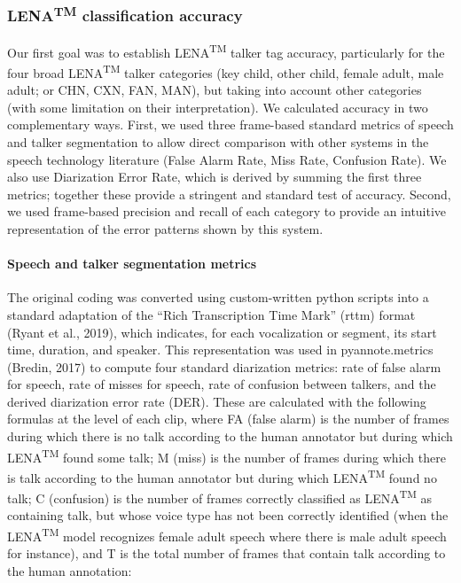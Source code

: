\documentclass[english,floatsintext,man]{apa6}
\begin{document}
\subsubsection{\texorpdfstring{LENA\textsuperscript{TM} classification
accuracy}{LENATM classification accuracy}}\label{lenatm-classification-accuracy}

Our first goal was to establish LENA\textsuperscript{TM} talker tag
accuracy, particularly for the four broad LENA\textsuperscript{TM}
talker categories (key child, other child, female adult, male adult; or
CHN, CXN, FAN, MAN), but taking into account other categories (with some
limitation on their interpretation). We calculated accuracy in two
complementary ways. First, we used three frame-based standard metrics of
speech and talker segmentation to allow direct comparison with other
systems in the speech technology literature (False Alarm Rate, Miss
Rate, Confusion Rate). We also use Diarization Error Rate, which is
derived by summing the first three metrics; together these provide a
stringent and standard test of accuracy. Second, we used frame-based
precision and recall of each category to provide an intuitive
representation of the error patterns shown by this system.

\paragraph{Speech and talker segmentation
metrics}\label{speech-and-talker-segmentation-metrics}

The original coding was converted using custom-written python scripts
into a standard adaptation of the \enquote{Rich Transcription Time Mark}
(rttm) format (Ryant et al., 2019), which indicates, for each
vocalization or segment, its start time, duration, and speaker. This
representation was used in pyannote.metrics (Bredin, 2017) to compute
four standard diarization metrics: rate of false alarm for speech, rate
of misses for speech, rate of confusion between talkers, and the derived
diarization error rate (DER). These are calculated with the following
formulas at the level of each clip, where FA (false alarm) is the number
of frames during which there is no talk according to the human annotator
but during which LENA\textsuperscript{TM} found some talk; M (miss) is
the number of frames during which there is talk according to the human
annotator but during which LENA\textsuperscript{TM} found no talk; C
(confusion) is the number of frames correctly classified as
LENA\textsuperscript{TM} as containing talk, but whose voice type has
not been correctly identified (when the LENA\textsuperscript{TM} model
recognizes female adult speech where there is male adult speech for
instance), and T is the total number of frames that contain talk
according to the human annotation:
\end{document}
